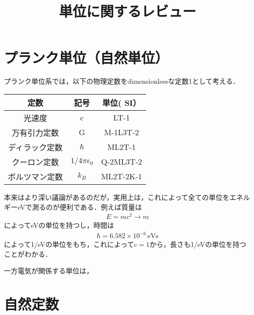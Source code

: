 \documentclass[a4j]{jarticle}
\title{単位に関するレビュー}
\author{}
\date{}
\begin{document}
\maketitle
\section{プランク単位（自然単位）}
プランク単位系では，以下の物理定数をdimensionlessな定数1として考える．
 \begin{table}[htb]
  \centering
 \begin{tabular}{|c|c|c|} \hline
  定数&記号 &単位( SI） \\ \hline
  光速度&c&LT-1 \\ \hline
  万有引力定数&G&M-1L3T-2\\ \hline
  ディラック定数&$\hbar$&ML2T-1\\ \hline
  クーロン定数&$1/4\pi\epsilon_0$&Q-2ML3T-2\\ \hline
  ボルツマン定数&$k_B$&ML2T-2K-1 \\ \hline
 \end{tabular}
 \end{table}
 
 本来はより深い議論があるのだが，実用上は，これによって全ての単位をエネルギーeVで測るのが便利である．例えば質量は
 \begin{align*}
  E=mc^2\to m
 \end{align*}
 によってeVの単位を持つし，時間は
 \begin{align*}
  \hbar=6.582\times 10^{-6}\,\mathrm{eVs}
 \end{align*}
によって1/eVの単位をもち，これによって$c=1$から，長さも1/eVの単位を持つことがわかる．

一方電気が関係する単位は，

 
\section{自然定数}
\end{document}
